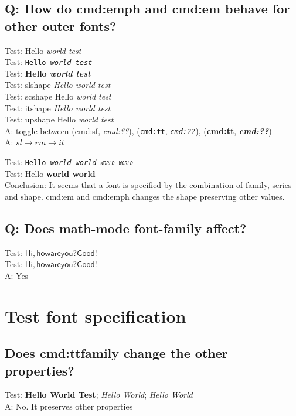 \documentclass[11pt]{revtex4-1}
\begin{document}
\subsection*{Q: How do cmd:emph and cmd:em behave for other outer fonts?}
Test: {\sf Hello {\em world {\em test}}} \\
Test: {\tt Hello {\em world {\em test}}} \\
Test: {\bf Hello {\em world {\em test}}} \\
Test: slshape {\sl Hello {\em world {\em test}}} \\
Test: scshape {\sc Hello {\em world {\em test}}} \\
Test: itshape {\it Hello {\em world {\em test}}} \\
Test: upshape {\upshape Hello {\em world {\em test}}} \\
A: toggle between ({\sf cmd:sf}, {\sf\em cmd:??}), ({\tt cmd:tt}, {\tt\em cmd:??}), ({\bf cmd:tt}, {\bf\em cmd:??}) \\
A: $sl \to rm \to it$

Test: {\tt Hello \slshape world \upshape world \scshape world \itshape world} \\
Test: {\rm Hello \bfseries world \mdseries world} \\
Conclusion: It seems that a font is specified by the combination of family, series and shape.
  cmd:em and cmd:emph changes the shape preserving other values.

\subsection*{Q: Does math-mode font-family affect?}
Test: $\mathsf{Hi,how are you? \text{Good!}}$ \\
Test: $\mathsf{Hi,how are you? \text{Good!}}$ \\
A: Yes

\section{Test font specification}
\subsection*{Does cmd:ttfamily change the other properties?}
Test: {\bfseries Hello \ttfamily World \rmfamily Test}; {\slshape Hello \ttfamily World}; {\itshape Hello \ttfamily World} \\
A: No. It preserves other properties
\end{document}
